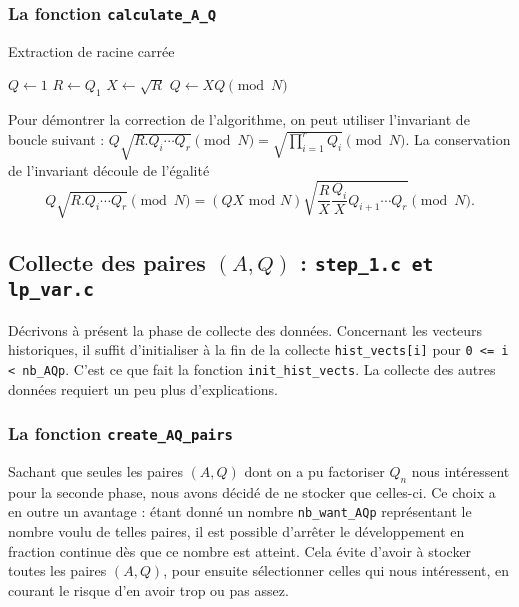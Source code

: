 \subsubsection{La fonction \texttt{calculate\_A\_Q}}

\vspace{1em}
\begin{algorithm}[H]
\DontPrintSemicolon
\caption{\sc Extraction de racine carrée}
$Q \gets 1$\;
$R \gets Q_1$\;
$X \gets \sqrt{R}$\;
    $Q \gets XQ \pmod{N}$\;
\;
\end{algorithm}
\vspace{1em}

Pour démontrer la correction de l'algorithme, on peut utiliser l'invariant de 
boucle suivant : $Q\sqrt{R.Q_i\cdots Q_r} \pmod{N} = \sqrt{\prod_{i=1}^r Q_{i}}
\pmod{N}$. La conservation de l'invariant découle de l'égalité
\[  Q\sqrt{R.Q_i\cdots Q_r} \pmod{N} = 
(QX\text{ mod }N) \sqrt{ \frac{R}{X}\frac{Q_i}{X}Q_{i+1} \cdots Q_r} \pmod{N}.\]

\subsection{Collecte des paires $(A,Q)$ : \texttt{step\_1.c et lp\_var.c}}

Décrivons à présent la phase de collecte des données. Concernant les vecteurs
historiques, il suffit d'initialiser à la fin de la 
collecte \texttt{hist\_vects[i]} pour \texttt{0 <= i < nb\_AQp}. C'est ce que fait 
la fonction \texttt{init\_hist\_vects}. La collecte des autres données 
requiert un peu plus d'explications. 

\subsubsection{La fonction \texttt{create\_AQ\_pairs}}

Sachant que seules les paires $(A,Q)$ dont on a pu factoriser $Q_n$ nous
intéressent pour la seconde phase, nous avons décidé de ne stocker que celles-ci.
Ce choix a en outre un avantage : étant donné un nombre \texttt{nb\_want\_AQp}
représentant le nombre voulu de telles paires, il est possible d'arrêter le 
développement en fraction continue dès que ce nombre est atteint. Cela évite
d'avoir à stocker toutes les paires $(A,Q)$, pour ensuite sélectionner celles 
qui nous intéressent, en courant le risque d'en avoir trop ou pas assez. \\

